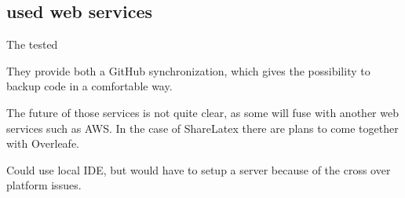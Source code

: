 \subsection*{used web services}

The tested 

They provide both a GitHub synchronization, which gives the possibility to backup code in a comfortable way.

The future of those services is not quite clear, as some will fuse with another web services such as AWS. In the case of ShareLatex there are plans to come together with Overleafe.

Could use local IDE, but would have to setup a server because of the cross over platform issues.
